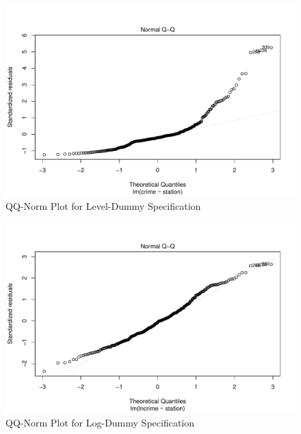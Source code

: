 \documentclass[a4paper, 11pt]{article}
\begin{document}
\begin{figure}
    \centering
    \includegraphics[scale=0.6]{figures/crime-qqplot.pdf}
    \caption{QQ-Norm Plot for Level-Dummy Specification}
    \label{fig:crime-qqplot}
\end{figure}

\begin{figure}
    \centering
    \includegraphics[scale=0.6]{figures/lncrime-qqplot.pdf}
    \caption{QQ-Norm Plot for Log-Dummy Specification}
    \label{fig:lncrime-qqplot}
\end{figure}
\end{document}
